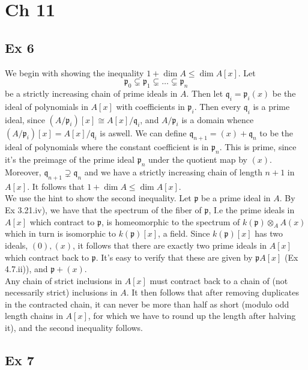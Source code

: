 \documentclass{article}
\theoremstyle{definition}
\begin{document}
\section*{Ch 11}

\subsection*{Ex 6}
We begin with showing the inequality $1 + \dim A \leq \dim A[x]$. Let 
\[
	\mathfrak{p}_0 \subsetneq \mathfrak{p}_1 \subsetneq \ldots \subsetneq \mathfrak{p}_n
\] 
be a strictly increasing chain of prime ideals in $A$. Then let $\mathfrak{q}_i
= \mathfrak{p}_i (x)$ be the ideal of polynomials in $A[x]$ with coefficients
in $\mathfrak{p}_i$. Then every $\mathfrak{q}_i$ is a prime ideal, since
$(A/\mathfrak{p}_i)[x] \cong A[x]/\mathfrak{q}_i$, and $A/\mathfrak{p}_i$ is a
domain whence $(A/\mathfrak{p}_{i})[x] = A[x]/\mathfrak{q}_i$ is aswell. We can
define $\mathfrak{q}_{n + 1} = (x) + \mathfrak{q}_n$ to be the ideal of
polynomials where the constant coefficient is in $\mathfrak{p}_n$. This is
prime, since it's the preimage of the prime ideal $\mathfrak{p}_n$ under the
quotient map by $(x)$. Moreover, $\mathfrak{q}_{n + 1} \supsetneq
\mathfrak{q}_n$ and we have a strictly increasing chain of length $n + 1$ in
$A[x]$. It follows that $1 + \dim A \leq \dim A[x]$. \\

We use the hint to show the second inequality. Let $\mathfrak{p}$ be a prime
ideal in $A$. By Ex 3.21.iv), we have that the spectrum of the fiber of
$\mathfrak{p}$, I.e the prime ideals in $A[x]$ which contract to
$\mathfrak{p}$, is homeomorphic to the spectrum of $k(\mathfrak{p}) \otimes_A
A(x)$ which in turn is isomorphic to $k(\mathfrak{p})[x]$, a field. Since
$k(\mathfrak{p})[x]$ has two ideals, $(0), (x)$, it follows that there are
exactly two prime ideals in $A[x]$ which contract back to $\mathfrak{p}$. It's
easy to verify that these are given by $\mathfrak{p}A[x]$ (Ex 4.7.ii)), and
$\mathfrak{p} + (x)$. \\

Any chain of strict inclusions in $A[x]$ must contract back to a chain of (not
necessarily strict) inclusions in $A$. It then follows that after removing
duplicates in the contracted chain, it can never be more than half as short
(modulo odd length chains in $A[x]$, for which we have to round up the length
after halving it), and the second inequality follows.

\subsection*{Ex 7}
\end{document}
